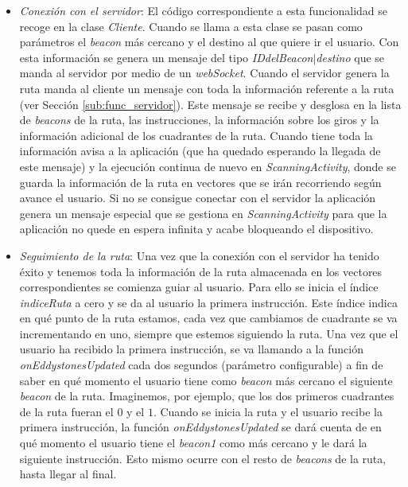 \begin{itemize}
	
	\item \textit{Conexión con el servidor}: El código correspondiente a esta funcionalidad se recoge en la clase \textit{Cliente}. Cuando se llama a esta clase se pasan como parámetros el \textit{beacon} más cercano y el destino al que quiere ir el usuario. Con esta información se genera un mensaje del tipo \textit{IDdelBeacon$|$destino} que se manda al servidor por medio de un \textit{webSocket}. Cuando el servidor genera la ruta manda al cliente un mensaje con toda la información referente a la ruta (ver Sección \ref{sub:func_servidor}). Este mensaje se recibe y desglosa en la lista de \textit{beacons} de la ruta, las instrucciones, la información sobre los giros y la información adicional de los cuadrantes de la ruta. Cuando tiene toda la información avisa a la aplicación (que ha quedado esperando la llegada de este mensaje) y la ejecución continua de nuevo en \textit{ScanningActivity}, donde se guarda la información de la ruta en vectores que se irán recorriendo según avance el usuario. Si no se consigue conectar con el servidor la aplicación genera un mensaje especial que se gestiona en \textit{ScanningActivity} para que la aplicación no quede en espera infinita y acabe bloqueando el dispositivo.
	
	
	\item \textit{Seguimiento de la ruta}: Una vez que la conexión con el servidor ha tenido éxito y tenemos toda la información de la ruta almacenada en los vectores correspondientes se comienza guiar al usuario. Para ello se inicia el índice \textit{indiceRuta} a cero y se da al usuario la primera instrucción. Este índice indica en qué punto de la ruta estamos, cada vez que cambiamos de cuadrante se va incrementando en uno, siempre que estemos siguiendo la ruta. Una vez que el usuario ha recibido la primera instrucción, se va llamando a la función \textit{onEddystonesUpdated} cada dos segundos (parámetro configurable) a fin de saber en qué momento el usuario tiene como \textit{beacon} más cercano el siguiente \textit{beacon} de la ruta. Imaginemos, por ejemplo, que los dos primeros cuadrantes de la ruta fueran el $0$ y el $1$. Cuando se inicia la ruta y el usuario recibe la primera instrucción, la función \textit{onEddystonesUpdated} se dará cuenta de en qué momento el usuario tiene el \textit{beacon1} como más cercano y le dará la siguiente instrucción. Esto mismo ocurre con el resto de \textit{beacons} de la ruta, hasta llegar al final. 
	

\end{itemize}
